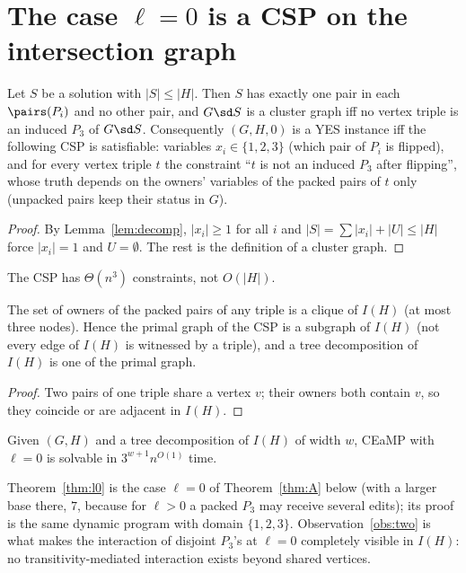 \section{The case \texorpdfstring{$\ell=0$}{l=0} is a CSP on the intersection graph}\label{sec:l0}
\begin{observation}\label{obs:one}
Let $S$ be a solution with $|S|\le|H|$. Then $S$ has exactly one pair in each $\pairs(P_i)$ and no other pair, and $G\sd S$ is a cluster graph iff no vertex triple is an induced $P_3$ of $G\sd S$. Consequently $(G,H,0)$ is a YES instance iff the following CSP is satisfiable: variables $x_i\in\{1,2,3\}$ (which pair of $P_i$ is flipped), and for every vertex triple $t$ the constraint ``$t$ is not an induced $P_3$ after flipping'', whose truth depends on the owners' variables of the packed pairs of $t$ only (unpacked pairs keep their status in $G$).
\end{observation}
\begin{proof}
By Lemma~\ref{lem:decomp}, $|x_i|\ge1$ for all $i$ and $|S|=\sum|x_i|+|U|\le|H|$ force $|x_i|=1$ and $U=\emptyset$. The rest is the definition of a cluster graph.
\end{proof}
The CSP has $\Theta(n^3)$ constraints, not $O(|H|)$.
\begin{observation}\label{obs:two}
The set of owners of the packed pairs of any triple is a clique of $I(H)$ (at most three nodes). Hence the primal graph of the CSP is a subgraph of $I(H)$ (not every edge of $I(H)$ is witnessed by a triple), and a tree decomposition of $I(H)$ is one of the primal graph.
\end{observation}
\begin{proof}
Two pairs of one triple share a vertex $v$; their owners both contain $v$, so they coincide or are adjacent in $I(H)$.
\end{proof}
\begin{theorem}\label{thm:l0}
Given $(G,H)$ and a tree decomposition of $I(H)$ of width $w$, CEaMP with $\ell=0$ is solvable in $3^{w+1}n^{O(1)}$ time.
\end{theorem}
Theorem~\ref{thm:l0} is the case $\ell=0$ of Theorem~\ref{thm:A} below (with a larger base there, $7$, because for $\ell>0$ a packed $P_3$ may receive several edits); its proof is the same dynamic program with domain $\{1,2,3\}$. Observation~\ref{obs:two} is what makes the interaction of disjoint $P_3$'s at $\ell=0$ completely visible in $I(H)$: no transitivity-mediated interaction exists beyond shared vertices.

